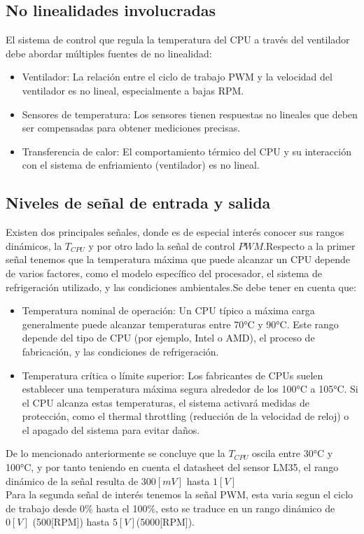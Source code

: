 \documentclass[12pt]{article}
\begin{document}
	\subsection{No linealidades involucradas}
	El sistema de control que regula la temperatura del CPU a través del ventilador debe abordar múltiples fuentes de no linealidad:
	\begin{itemize}
		\item Ventilador: La relación entre el ciclo de trabajo PWM y la velocidad del ventilador es no lineal, especialmente a bajas RPM.
		\item Sensores de temperatura: Los sensores tienen respuestas no lineales que deben ser compensadas para obtener mediciones precisas.
		\item Transferencia de calor: El comportamiento térmico del CPU y su interacción con el sistema de enfriamiento (ventilador) es no lineal.
	\end{itemize}
	
	\subsection{Niveles de señal de entrada y salida}
	Existen dos principales señales, donde es de especial interés conocer sus rangos dinámicos, la  $T_{CPU}$ y por otro lado la señal de control $PWM$.Respecto a la primer señal tenemos que la temperatura máxima que puede alcanzar un CPU depende de varios factores, como el modelo específico del procesador, el sistema de refrigeración utilizado, y las condiciones ambientales.Se debe tener en cuenta que:
	\begin{itemize}
		\item Temperatura nominal de operación: Un CPU típico a máxima carga generalmente puede alcanzar temperaturas entre 70°C y 90°C. Este rango depende del tipo de CPU (por ejemplo, Intel o AMD), el proceso de fabricación, y las condiciones de refrigeración.
		\item Temperatura crítica o límite superior: Los fabricantes de CPUs suelen establecer una temperatura máxima segura alrededor de los 100°C a 105°C. Si el CPU alcanza estas temperaturas, el sistema activará medidas de protección, como el thermal throttling (reducción de la velocidad de reloj) o el apagado del sistema para evitar daños.
	\end{itemize}
	
	De lo mencionado anteriormente se concluye que la $T_{CPU}$ oscila entre 30°C  y 100°C, y por tanto teniendo en cuenta el datasheet del sensor LM35, el rango dinámico de la señal resulta de $300[mV]$ hasta $1[V]$ \\
	Para la segunda señal de interés tenemos la señal PWM, esta varia segun el ciclo de trabajo desde 0\% hasta el 100\%, esto se traduce en un rango dinámico de $0[V]$ (500[RPM]) hasta $5[V]$(5000[RPM]).
	 
\end{document}
